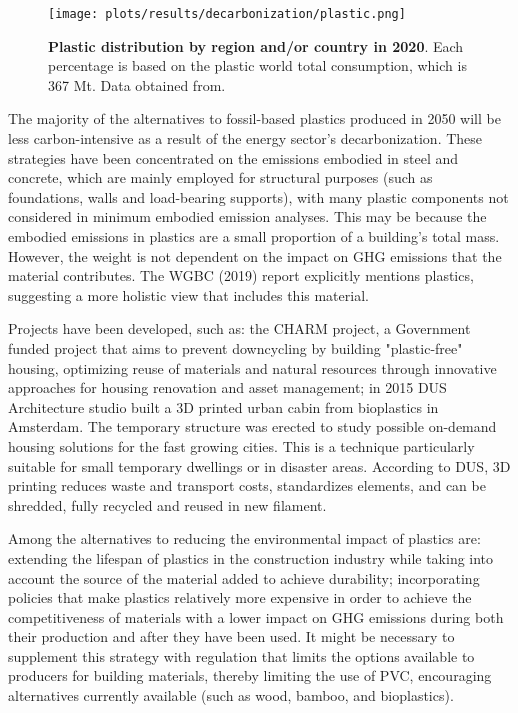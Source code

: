 \begin{figure}[ht!]
  \centering
  \texttt{[image: plots/results/decarbonization/plastic.png]}
  \caption[Plastic distribution by region and/or country in 2020]{\textbf{Plastic distribution by region and/or country in 2020}. Each percentage is based on the plastic world total consumption, which is 367 Mt. Data obtained from.\autocite{plasticseurpo_2021}}
  \label{fig:plastic}
\end{figure}


The majority of the alternatives to fossil-based plastics produced in 2050 will be less carbon-intensive as a result of the energy sector's decarbonization.\autocite{pickard2020phasing} These strategies have been concentrated on the emissions embodied in steel and concrete, which are mainly employed for structural purposes (such as foundations, walls and load-bearing supports), with many plastic components not considered in minimum embodied emission analyses.\autocite{elkerbout2021impact} This may be because the embodied emissions in plastics are a small proportion of a building’s total mass. However, the weight is not dependent on the impact on GHG emissions that the material contributes. The WGBC (2019) report\autocite{world2019worldgbc} explicitly mentions plastics, suggesting a more holistic view that includes this material. 

Projects have been developed, such as: the CHARM project, a Government funded project that aims to prevent downcycling by building "plastic-free" housing, optimizing reuse of materials and natural resources through innovative approaches for housing renovation and asset management;\autocite{asbp_2020} in 2015 DUS Architecture studio built a 3D printed urban cabin from bioplastics in Amsterdam. The temporary structure was erected to study possible on-demand housing solutions for the fast growing cities. This is a technique particularly suitable for small temporary dwellings or in disaster areas. According to DUS, 3D printing reduces waste and transport costs, standardizes elements, and can be shredded, fully recycled and reused in new filament.\autocite{lanko2017additive} 

Among the alternatives to reducing the environmental impact of plastics are: extending the lifespan of plastics in the construction industry while taking into account the source of the material added to achieve durability; incorporating policies that make plastics relatively more expensive in order to achieve the competitiveness of materials with a lower impact on GHG emissions during both their production and after they have been used. It might be necessary to supplement this strategy with regulation that limits the options available to producers for building materials, thereby limiting the use of PVC, encouraging alternatives currently available (such as wood, bamboo, and bioplastics). 



